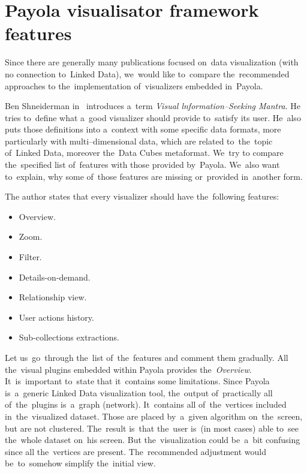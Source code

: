 \section{Payola visualisator framework features}
\label{sec:rw:mantra}
Since there are generally many publications focused on~data visualization (with no
connection to~Linked Data), we~would like to~compare the~recommended approaches to
the~implementation of~visualizers embedded in~Payola.

Ben Shneiderman in~\cite{mantra} introduces a~term \emph{Visual lnformation--Seeking Mantra}.
He tries to~define
what a~good visualizer should provide to~satisfy its user. He~also puts those definitions into
a~context with some specific data formats, more particularly with multi--dimensional data,
which are related to~the~topic of~Linked Data, moreover the~Data Cubes metaformat. We~try to
compare the~specified list of~features with those provided by~Payola. We~also want to~explain,
why some of~those features are missing or~provided in~another form.

The author states that every visualizer should have the~following features:

\begin{itemize}
\item Overview.
\item Zoom.
\item Filter.
\item Details-on-demand.
\item Relationship view.
\item User actions history.
\item Sub-collections extractions.
\end{itemize}

Let us~go~through the~list of~the~features and comment them gradually. All the~visual plugins
embedded within Payola provides the~\emph{Overview}. It~is~important to~state
that it~contains some limitations. Since Payola is~a~generic Linked Data visualization tool,
the~output of~practically all of~the~plugins is~a~graph (network). It~contains all of~the~vertices
included in~the~visualized dataset. Those are placed by~a~given algorithm on~the~screen,
but are not clustered. The~result is~that the~user is~(in most cases) able to~see the~whole
dataset on~his screen. But the~visualization could be~a~bit confusing since all the~vertices
are present. The~recommended adjustment would be~to~somehow simplify the~initial view.

